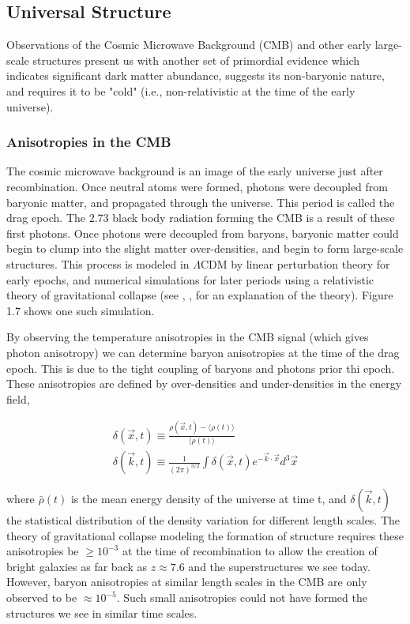 \documentclass{report}
\begin{document}
\subsection{Universal Structure}
Observations of the Cosmic Microwave Background (CMB) and other early large-scale structures present us with another set of primordial evidence which indicates significant dark matter abundance, suggests its non-baryonic nature, and requires it to be "cold" (i.e., non-relativistic at the time of the early universe).

\subsubsection{Anisotropies in the CMB}
The cosmic microwave background is an image of the early universe just after recombination. Once neutral atoms were formed, photons were decoupled from baryonic matter, and propagated through the universe. This period is called the drag epoch. The 2.73 black body radiation forming the CMB is a result of these first photons. Once photons were decoupled from baryons, baryonic matter could begin to clump into the slight matter over-densities, and begin to form large-scale structures. This process is modeled in $\Lambda$CDM by linear perturbation theory for early epochs, and numerical simulations for later periods using a relativistic theory of gravitational collapse (see \cite{Kolb1990}, \cite{Padmanabhan1993}, \cite{Liddle2000} for an explanation of the theory). Figure 1.7 shows one such simulation.

By observing the temperature anisotropies in the CMB signal (which gives photon anisotropy) we can determine baryon anisotropies at the time of the drag epoch. This is due to the tight coupling of baryons and photons prior thi epoch. These anisotropies are defined by over-densities and under-densities in the energy field,

\begin{eqnarray}
\delta(\vec{x},t) \equiv \frac{\rho(\vec{x},t) - \langle\rho(t)\rangle}{\langle\rho(t)\rangle} \\
\delta(\vec{k},t) \equiv \frac{1}{(2\pi)^{3/2}} \int \delta(\vec{x},t) e^{-\vec{k} \cdot \vec{x}} d^3 \vec{x}
\end{eqnarray}

where $\bar{\rho}(t)$ is the mean energy density of the universe at time t, and $\delta(\vec{k},t)$ the statistical distribution of the density variation for different length scales. The theory of gravitational collapse modeling the formation of structure requires these anisotropies be $\geq 10^{-3}$ at the time of recombination to allow the creation of bright galaxies as far back as $z \approx 7.6 $ \cite{Bradley2008} and the superstructures we see today. However, baryon anisotropies at similar length scales in the CMB are only observed to be $\approx 10^{-5}$. Such small anisotropies could not have formed the structures we see in similar time scales.
\end{document}
